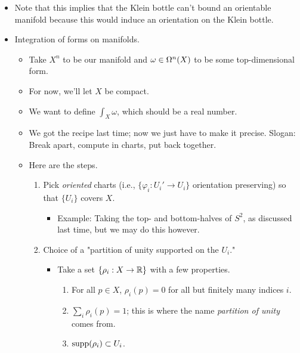 \documentclass[../notes.tex]{subfiles}
\begin{document}
\begin{itemize}
\begin{itemize}
    \end{itemize}
    \item Note that this implies that the Klein bottle can't bound an orientable manifold because this would induce an orientation on the Klein bottle.
    \item Integration of forms on manifolds.
    \begin{itemize}
        \item Take $X^n$ to be our manifold and $\omega\in\ome[n]{X}$ to be some top-dimensional form.
        \item For now, we'll let $X$ be compact.
        \item We want to define $\int_X\omega$, which should be a real number.
        \item We got the recipe last time; now we just have to make it precise. Slogan: Break apart, compute in charts, put back together.
        \item Here are the steps.
        \begin{enumerate}
            \item Pick \emph{oriented} charts (i.e., $\{\varphi_i:U_i'\to U_i\}$ orientation preserving) so that $\{U_i\}$ covers $X$.
            \begin{itemize}
                \item Example: Taking the top- and bottom-halves of $S^2$, as discussed last time, but we may do this however.
            \end{itemize}
            \item Choice of a "partition of unity supported on the $U_i$."
            \begin{itemize}
                \item Take a set $\{\rho_i:X\to\R\}$ with a few properties.
                \begin{enumerate}
                    \item For all $p\in X$, $\rho_i(p)=0$ for all but finitely many indices $i$.
                    \item $\sum_i\rho_i(p)=1$; this is where the name \emph{partition of unity} comes from.
                    \item $\supp(\rho_i)\subset U_i$.
                \end{enumerate}
            \end{itemize}
        \end{enumerate}
    \end{itemize}
\end{itemize}
\end{document}
